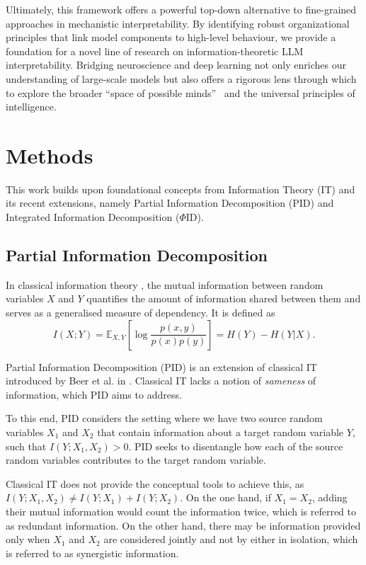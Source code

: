 \documentclass[11pt,a4paper]{ouparticle}
\begin{document}
Ultimately, this framework offers a powerful top-down alternative to fine-grained approaches in mechanistic interpretability. By identifying robust organizational principles that link model components to high-level behaviour, we provide a foundation for a novel line of research on information-theoretic LLM interpretability. Bridging neuroscience and deep learning not only enriches our understanding of large-scale models but also offers a rigorous lens through which to explore the broader ``space of possible minds''~\cite{sloman1984structure} and the universal principles of intelligence.


\section*{Methods}\label{sec:methods}

This work builds upon foundational concepts from Information Theory (IT) and its recent extensions, namely Partial Information Decomposition (PID) and Integrated Information Decomposition ($\Phi$ID).


\subsection*{Partial Information Decomposition}

In classical information theory \cite{shannon_1948}, the mutual information between random variables $X$ and $Y$ quantifies the amount of information shared between them and serves as a generalised measure of dependency. It is defined as 
\begin{equation*}
    I(X;Y) = \mathbb{E}_{X,Y} \left[\log \frac{p(x,y)}{p(x)p(y)}\right] = H(Y) - H(Y|X).
\end{equation*}


Partial Information Decomposition (PID) is an extension of classical IT introduced by Beer et al. in \cite{pid2010beer}. Classical IT lacks a notion of \textit{sameness} of information, which PID aims to address.

To this end, PID considers the setting where we have two source random variables $X_1$ and $X_2$ that contain information about a target random variable $Y$, such that $I(Y;X_1, X_2)>0$. PID seeks to disentangle how each of the source random variables contributes to the target random variable.

Classical IT does not provide the conceptual tools to achieve this, as $I(Y;X_1, X_2) \neq I(Y;X_1) + I(Y;X_2)$. On the one hand, if $X_1=X_2$, adding their mutual information would count the information twice, which is referred to as redundant information. On the other hand, there may be information provided only when $X_1$ and $X_2$ are considered jointly and not by either in isolation, which is referred to as synergistic information.
\end{document}
